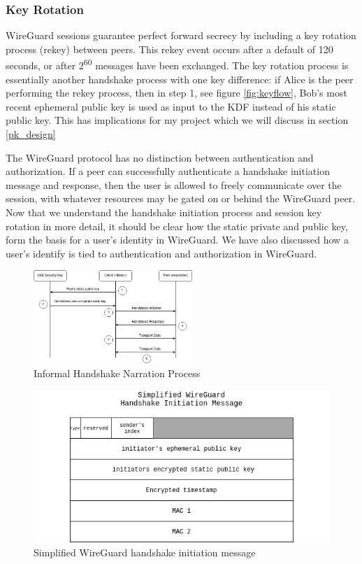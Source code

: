 \documentclass [11pt, proquest] {uwthesis}[2020/02/24]
\begin{document}
\subsubsection{Key Rotation}
\label{keyrotate}
WireGuard sessions guarantee perfect forward secrecy by including a key rotation process (rekey) between peers. This rekey event occurs after a default of 120 seconds, or after 2\textsuperscript{60} messages have been exchanged. The key rotation process is essentially another handshake process with one key difference: if Alice is the peer performing the rekey process, then in step 1, see figure \ref{fig:keyflow}, Bob's most recent ephemeral public key is used as input to the KDF instead of his static public key. This has implications for my project which we will discuss in section \ref{pk_design}

The WireGuard protocol has no distinction between authentication and authorization. If a peer can successfully authenticate a handshake initiation message and response, then the user is allowed to freely communicate over the session, with whatever resources may be gated on or behind the WireGuard peer.
Now that we understand the handshake initiation process and session key rotation in more detail, it should be clear how the static private and public key, form the basis for a user's identity in WireGuard. We have also discussed how a user's identify is tied to authentication and authorization in WireGuard.

\begin{figure}[ht]
\includegraphics[width=6cm]{paper/images/Process_Diagram.drawio.png}
\caption{Informal Handshake Narration Process}
\label{fig:handshake_process}
\end{figure}


\label{handshake_message}

\begin{figure}[ht]
\includegraphics[width=12cm]{paper/images/Wg_hand_init.drawio.png}
\caption{Simplified WireGuard handshake initiation message}
\label{fig:hand_init}
\end{figure}
\end{document}

